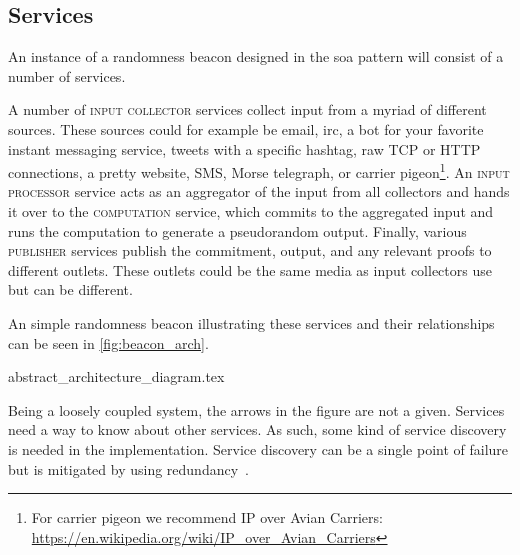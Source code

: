 \subsection{Services}%
\label{sub:components_of_a_beacon}

An instance of a randomness beacon designed in the \gls{soa} pattern will consist of a number of services.

A number of \textsc{input collector} services collect input from a myriad of different sources. These sources could for example be email, irc, a bot for your favorite instant messaging service, tweets with a specific hashtag, raw TCP or HTTP connections, a pretty website, SMS, Morse telegraph, or carrier pigeon\footnote{For carrier pigeon we recommend IP over Avian Carriers: \url{https://en.wikipedia.org/wiki/IP_over_Avian_Carriers}}.
An \textsc{input processor} service acts as an aggregator of the input from all collectors and hands it over to the \textsc{computation} service, which commits to the aggregated input and runs the computation to generate a pseudorandom output.
Finally, various \textsc{publisher} services publish the commitment, output, and any relevant proofs to different outlets. These outlets could be the same media as input collectors use but can be different.

An simple randomness beacon illustrating these services and their relationships can be seen in \cref{fig:beacon_arch}.

{abstract_architecture_diagram.tex}

Being a loosely coupled system, the arrows in the figure are not a given. Services need a way to know about other services. As such, some kind of service discovery is needed in the implementation. Service discovery can be a single point of failure but is mitigated by using redundancy~\cite{soa_redundancy}.
